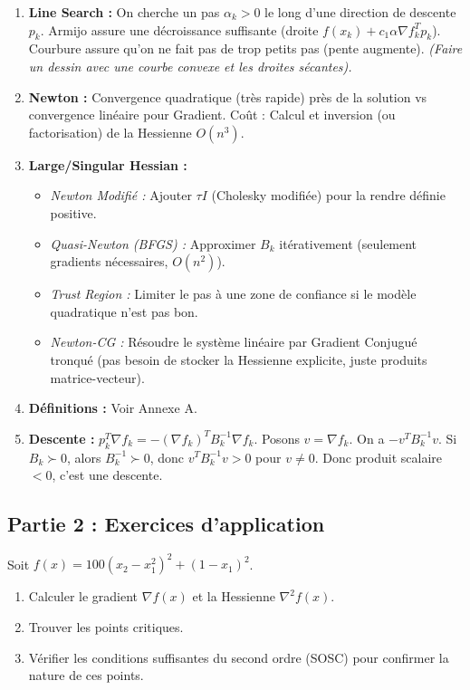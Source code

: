 \begin{correction}
\begin{enumerate}
    \item \textbf{Line Search :} On cherche un pas $\alpha_k > 0$ le long d'une direction de descente $p_k$. Armijo assure une décroissance suffisante (droite $f(x_k) + c_1 \alpha \nabla f_k^T p_k$). Courbure assure qu'on ne fait pas de trop petits pas (pente augmente). \textit{(Faire un dessin avec une courbe convexe et les droites sécantes).}
    \item \textbf{Newton :} Convergence quadratique (très rapide) près de la solution vs convergence linéaire pour Gradient. Coût : Calcul et inversion (ou factorisation) de la Hessienne $O(n^3)$.
    \item \textbf{Large/Singular Hessian :}
    \begin{itemize}
        \item \textit{Newton Modifié :} Ajouter $\tau I$ (Cholesky modifiée) pour la rendre définie positive.
        \item \textit{Quasi-Newton (BFGS) :} Approximer $B_k$ itérativement (seulement gradients nécessaires, $O(n^2)$).
        \item \textit{Trust Region :} Limiter le pas à une zone de confiance si le modèle quadratique n'est pas bon.
        \item \textit{Newton-CG :} Résoudre le système linéaire par Gradient Conjugué tronqué (pas besoin de stocker la Hessienne explicite, juste produits matrice-vecteur).
    \end{itemize}
    \item \textbf{Définitions :} Voir Annexe A.
    \item \textbf{Descente :} $p_k^T \nabla f_k = - (\nabla f_k)^T B_k^{-1} \nabla f_k$. Posons $v = \nabla f_k$. On a $- v^T B_k^{-1} v$. Si $B_k \succ 0$, alors $B_k^{-1} \succ 0$, donc $v^T B_k^{-1} v > 0$ pour $v \ne 0$. Donc produit scalaire $< 0$, c'est une descente.
\end{enumerate}
\end{correction}
\bigskip

\subsection*{Partie 2 : Exercices d'application}

\bigskip
\begin{exercice}
Soit $f(x) = 100(x_2 - x_1^2)^2 + (1 - x_1)^2$.
\begin{enumerate}
    \item Calculer le gradient $\nabla f(x)$ et la Hessienne $\nabla^2 f(x)$.
    \item Trouver les points critiques.
    \item Vérifier les conditions suffisantes du second ordre (SOSC) pour confirmer la nature de ces points.
\end{enumerate}
\end{exercice}

